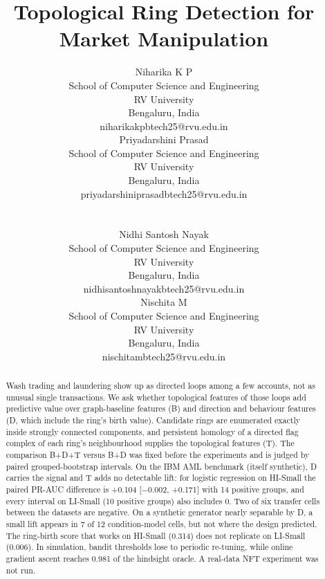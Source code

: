 \documentclass[conference]{IEEEtran}
\newcommand{\mi}{\ensuremath{-}}
\begin{document}
\title{Topological Ring Detection for Market Manipulation}

\author{\parbox[t]{\textwidth}{\centering
\parbox[t]{0.48\textwidth}{\centering
Niharika K P\\
School of Computer Science and Engineering\\
RV University\\
Bengaluru, India\\
niharikakpbtech25@rvu.edu.in}\hfill
\parbox[t]{0.48\textwidth}{\centering
Priyadarshini Prasad\\
School of Computer Science and Engineering\\
RV University\\
Bengaluru, India\\
priyadarshiniprasadbtech25@rvu.edu.in}\\[2ex]
\parbox[t]{0.48\textwidth}{\centering
Nidhi Santosh Nayak\\
School of Computer Science and Engineering\\
RV University\\
Bengaluru, India\\
nidhisantoshnayakbtech25@rvu.edu.in}\hfill
\parbox[t]{0.48\textwidth}{\centering
Nischita M\\
School of Computer Science and Engineering\\
RV University\\
Bengaluru, India\\
nischitambtech25@rvu.edu.in}}}

\maketitle

\begin{abstract}
Wash trading and laundering show up as directed loops among a few accounts, not as unusual single transactions. We ask whether topological features of those loops add predictive value over graph-baseline features (B) and direction and behaviour features (D, which include the ring's birth value). Candidate rings are enumerated exactly inside strongly connected components, and persistent homology of a directed flag complex of each ring's neighbourhood supplies the topological features (T). The comparison B+D+T versus B+D was fixed before the experiments and is judged by paired grouped-bootstrap intervals. On the IBM AML benchmark (itself synthetic), D carries the signal and T adds no detectable lift: for logistic regression on HI-Small the paired PR-AUC difference is +0.104 [\mi0.002, +0.171] with 14 positive groups, and every interval on LI-Small (10 positive groups) also includes 0. Two of six transfer cells between the datasets are negative. On a synthetic generator nearly separable by D, a small lift appears in 7 of 12 condition-model cells, but not where the design predicted. The ring-birth score that works on HI-Small (0.314) does not replicate on LI-Small (0.006). In simulation, bandit thresholds lose to periodic re-tuning, while online gradient ascent reaches 0.981 of the hindsight oracle. A real-data NFT experiment was not run.
\end{abstract}
\end{document}

